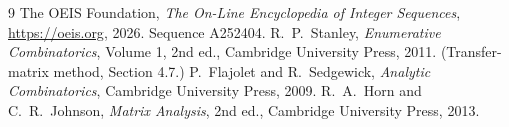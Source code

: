 \documentclass[11pt,a4paper]{article}
\theoremstyle{plain}
\theoremstyle{definition}
\begin{document}
\begin{thebibliography}{9}
 The OEIS Foundation, \emph{The On-Line Encyclopedia of Integer
Sequences}, \url{https://oeis.org}, 2026. Sequence A252404.
 R.~P.~Stanley, \emph{Enumerative Combinatorics}, Volume 1, 2nd ed.,
Cambridge University Press, 2011. (Transfer-matrix method, Section 4.7.)
 P.~Flajolet and R.~Sedgewick, \emph{Analytic Combinatorics}, Cambridge
University Press, 2009.
 R.~A.~Horn and C.~R.~Johnson, \emph{Matrix Analysis}, 2nd ed., Cambridge
University Press, 2013.
\end{thebibliography}
\end{document}

